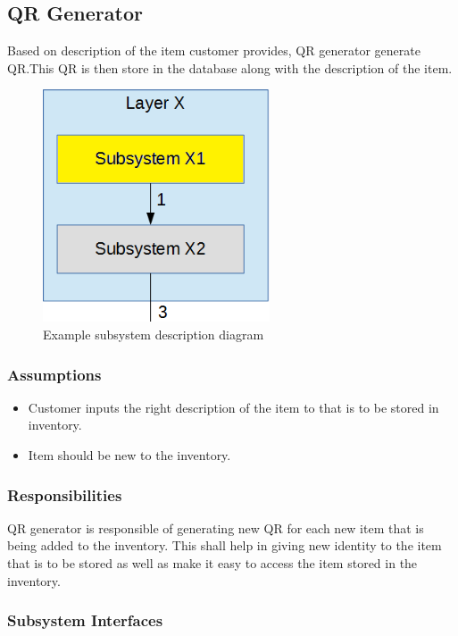 \subsection{QR Generator}
Based on description of the item customer provides, QR generator generate QR.This QR is then store in the database along with the  description of the item.

\begin{figure}[h!]
	\centering
 	\includegraphics[width=0.60\textwidth]{images/subsystem}
 \caption{Example subsystem description diagram}
\end{figure}

\subsubsection{Assumptions}
\begin{itemize}
    \item Customer inputs the right description of the item to  that is to be stored in inventory.
    \item Item should be new to the inventory.
    
\end{itemize}

\subsubsection{Responsibilities}
QR generator is responsible of generating new QR for each new item that is being added to the inventory. This shall help in giving new identity to the item that is to be stored as well as make it easy to access the item stored in the inventory.

\subsubsection{Subsystem Interfaces}

